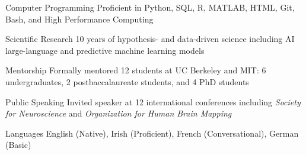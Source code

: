 
\begin{cvskills}

 \cvskill
 {Computer Programming}
 {Proficient in Python, SQL, R, MATLAB, HTML, Git, Bash, and High Performance Computing} %
 
 \cvskill
 {Scientific Research}
 {10 years of hypothesis- and data-driven science including AI large-language and predictive machine learning models} %
 
 \cvskill
 {Mentorship}
 {Formally mentored 12 students at UC Berkeley and MIT: 6 undergraduates, 2 postbaccalaureate students, and 4 PhD students} 
   
 \cvskill
 {Public Speaking}
 {Invited speaker at 12 international conferences including \textit{Society for Neuroscience} and \textit{Organization for Human Brain Mapping}}
   
\cvskill
{Languages}
{English (Native), Irish (Proficient), French (Conversational), German (Basic)}
    

\end{cvskills}
